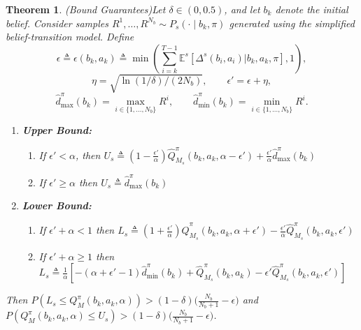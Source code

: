 \documentclass[acmlarge, manuscript, screen, review, natbib=false, oneside]{acmart}
\newtheorem{theorem}{Theorem}[section]
\begin{document}
\begin{theorem}(Bound Guarantees)\label{prf:guarantees}
	Let $\delta \in (0,0.5)$, and let $b_k$ denote the initial belief. Consider samples $R^1,\dots,R^{N_b} \sim P_s(\cdot \mid b_k,\pi)$ generated using the simplified belief-transition model. Define
	\begin{equation}
		\epsilon \triangleq \epsilon(b_k, a_k) \triangleq \min(\sum_{i=k}^{T-1} \mathbb{E}^s[\Delta^s(b_i, a_i)|b_k, a_k,\pi], 1),
	\end{equation}
	\begin{equation}
		\eta = \sqrt{\ln(1/\delta)/(2N_b)}, \qquad \epsilon' = \epsilon + \eta,
	\end{equation}
	\begin{equation}
		\hat{d}_{\max}^\pi(b_k) = \max_{i \in \{1,\dots,N_b\}} R^i, \qquad \hat{d}_{\min}^\pi(b_k) = \min_{i \in \{1,\dots,N_b\}} R^i.
	\end{equation}
	\begin{enumerate}
		\item \textbf{Upper Bound:} \begin{enumerate}
			\item If $\epsilon'<\alpha$, then
			$U_s\triangleq (1-\frac{\epsilon'}{\alpha}) \hat{Q}^\pi_{M_s}(b_k,a_k,\alpha-\epsilon') + \frac{\epsilon'}{\alpha}\hat{d}_{\max}^\pi(b_k)$
			\item If $\epsilon' \geq \alpha$ then $U_s\triangleq \hat{d}_{\max}^\pi(b_k)$
		\end{enumerate}
		\item \textbf{Lower Bound:} \begin{enumerate}
			\item If $\epsilon' + \alpha < 1$ then
			$
			L_s\triangleq (1+\frac{\epsilon'}{\alpha}) \hat{Q}^\pi_{M_s}(b_k,a_k,\alpha+\epsilon') - \frac{\epsilon'}{\alpha} \hat{Q}^\pi_{M_s}(b_k,a_k, \epsilon')
			$
			\item If $\epsilon' + \alpha \geq 1$ then
			$
			L_s\triangleq\frac{1}{\alpha}[-(\alpha + \epsilon' - 1)
			\hat{d}_{\min}^\pi(b_k)+\hat{Q}^\pi_{M_s}(b_k,a_k)-\epsilon' \hat{Q}^\pi_{M_s}(b_k,a_k,\epsilon')]
			$
		\end{enumerate}
	\end{enumerate}
	Then $P(L_s \leq Q_M^\pi(b_k, a_k,\alpha)) > (1-\delta)\Big(\frac{N_b}{N_b+1} - \epsilon\Big)$ and $P(Q_M^\pi(b_k, a_k,\alpha)\leq U_s)> (1-\delta)\Big(\frac{N_b}{N_b+1} - \epsilon\Big)$.
\end{theorem}
\end{document}
